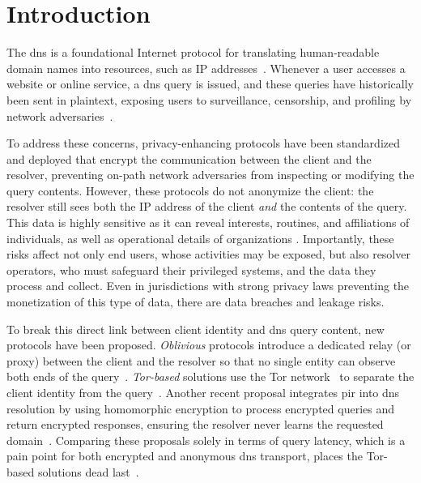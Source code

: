 \section{Introduction} \label{sec:intro}

The \ac{dns} is a foundational Internet protocol for translating human-readable
domain names into resources, such as IP addresses~\cite{RFC1034,RFC1035}.
Whenever a user accesses a website or online service, a \ac{dns} query is
issued, and these queries have historically been sent in plaintext, exposing
users to surveillance, censorship, and profiling by network
adversaries~\cite{HoangNDKLMCGP21,KimZ15,PearceJLEFWP17}.

To address these concerns, privacy-enhancing protocols
\cite{RFC8484,RFC7858,RFC9250} have been standardized and deployed that encrypt
the communication between the client and the resolver, preventing on-path
network adversaries from inspecting or modifying the query contents. However,
these protocols do not anonymize the client: the resolver still sees both the IP
address of the client \emph{and} the contents of the query. This data is highly
sensitive as it can reveal interests, routines, and affiliations of individuals,
as well as operational details of organizations \cite{resolver-wiretap,RFC9076}.
Importantly, these risks affect not only end users, whose activities may be
exposed, but also resolver operators, who must safeguard their privileged
systems, and the data they process and collect. Even in jurisdictions with
strong privacy laws preventing the monetization of this type of data, there are
data breaches and leakage risks.

To break this direct link between client identity and \ac{dns} query content,
new protocols have been proposed. \emph{Oblivious} protocols introduce a
dedicated relay (or proxy) between the client and the resolver so that no
single entity can observe both ends of the query~\cite{RFC9230,ODNS}.
\emph{Tor-based} solutions use the Tor network~\cite{dingledine2004} to
separate the client identity from the query~\cite{DoHoT}. Another recent
proposal integrates \ac{pir} into \ac{dns} resolution by using homomorphic
encryption to process encrypted queries and return encrypted responses,
ensuring the resolver never learns the requested domain~\cite{xiao2025}.
Comparing these proposals solely in terms of query latency, which is a pain
point for both encrypted and anonymous \ac{dns} transport, places the Tor-based
solutions dead last~\cite{RFC9230,kurihara2023muodns,ODNS,xiao2025}.

